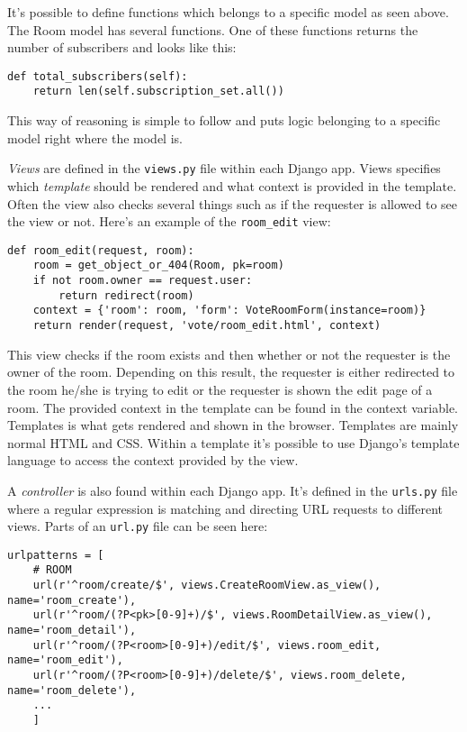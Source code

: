 It's possible to define functions which belongs to a specific model as seen above. The Room model has several functions. One of these functions returns the number of subscribers and looks like this:

\begin{lstlisting}[caption=The total subscribers method, label=lst:total-subscribers-method]
def total_subscribers(self):
    return len(self.subscription_set.all())
\end{lstlisting}
This way of reasoning is simple to follow and puts logic belonging to a specific model right where the model is.

\emph{Views} are defined in the \texttt{views.py} file within each Django app. Views specifies which \emph{template} should be rendered and what context is provided in the template. Often the view also checks several things such as if the requester is allowed to see the view or not. Here's an example of the \texttt{room\_edit} view:

\begin{lstlisting}[caption=The Room edit method, label=lst:room-edit-method]
def room_edit(request, room):
    room = get_object_or_404(Room, pk=room)
    if not room.owner == request.user:
        return redirect(room)
    context = {'room': room, 'form': VoteRoomForm(instance=room)}
    return render(request, 'vote/room_edit.html', context)
\end{lstlisting}

This view checks if the room exists and then whether or not the requester is the owner of the room. Depending on this result, the requester is either redirected to the room he/she is trying to edit or the requester is shown the edit page of a room. The provided context in the template can be found in the context variable. Templates is what gets rendered and shown in the browser. Templates are mainly normal HTML and CSS. Within a template it's possible to use Django's template language to access the context provided by the view. 

A \emph{controller} is also found within each Django app. It's defined in the \texttt{urls.py} file where a regular expression is matching and directing URL requests to different views. Parts of an \texttt{url.py} file can be seen here:


\begin{lstlisting}[caption=URL Patterns from the vote app, label=lst:urlpatterns]
urlpatterns = [
    # ROOM
    url(r'^room/create/$', views.CreateRoomView.as_view(), name='room_create'),
    url(r'^room/(?P<pk>[0-9]+)/$', views.RoomDetailView.as_view(), name='room_detail'),
    url(r'^room/(?P<room>[0-9]+)/edit/$', views.room_edit, name='room_edit'),
    url(r'^room/(?P<room>[0-9]+)/delete/$', views.room_delete, name='room_delete'),
    ...
    ]
\end{lstlisting}

